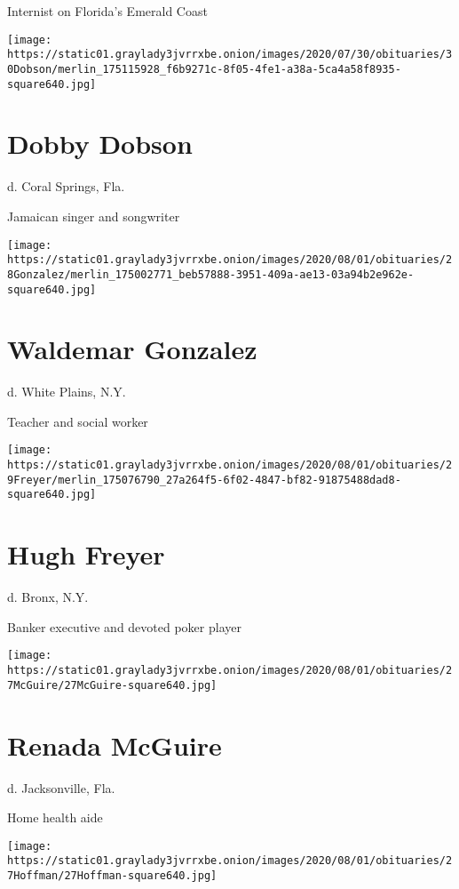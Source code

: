 Internist on Florida's Emerald Coast

\texttt{[image: https://static01.graylady3jvrrxbe.onion/images/2020/07/30/obituaries/30Dobson/merlin\_175115928\_f6b9271c-8f05-4fe1-a38a-5ca4a58f8935-square640.jpg]}

\hypertarget{dobby-dobson}{%
\section{Dobby Dobson}\label{dobby-dobson}}

d. Coral Springs, Fla.

Jamaican singer and songwriter

\texttt{[image: https://static01.graylady3jvrrxbe.onion/images/2020/08/01/obituaries/28Gonzalez/merlin\_175002771\_beb57888-3951-409a-ae13-03a94b2e962e-square640.jpg]}

\hypertarget{waldemar-gonzalez}{%
\section{Waldemar Gonzalez}\label{waldemar-gonzalez}}

d. White Plains, N.Y.

Teacher and social worker

\texttt{[image: https://static01.graylady3jvrrxbe.onion/images/2020/08/01/obituaries/29Freyer/merlin\_175076790\_27a264f5-6f02-4847-bf82-91875488dad8-square640.jpg]}

\hypertarget{hugh-freyer}{%
\section{Hugh Freyer}\label{hugh-freyer}}

d. Bronx, N.Y.

Banker executive and devoted poker player

\texttt{[image: https://static01.graylady3jvrrxbe.onion/images/2020/08/01/obituaries/27McGuire/27McGuire-square640.jpg]}

\hypertarget{renada-mcguire}{%
\section{Renada McGuire}\label{renada-mcguire}}

d. Jacksonville, Fla.

Home health aide

\texttt{[image: https://static01.graylady3jvrrxbe.onion/images/2020/08/01/obituaries/27Hoffman/27Hoffman-square640.jpg]}

